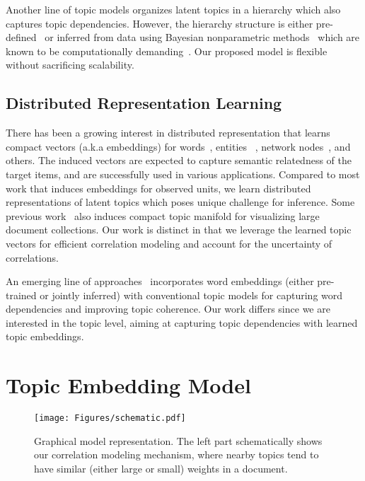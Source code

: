 \documentclass[sigconf]{acmart}
\begin{document}
Another line of topic models organizes latent topics in a hierarchy which also captures topic dependencies. However, the hierarchy structure is either pre-defined~\cite{li2006pachinko,hu2016grounding,boyd2007topic} or inferred from data using Bayesian nonparametric methods~\cite{dubey2014dependent,blei2010nested} which are known to be computationally demanding~\cite{gal2014pitfalls,hu2015large}. Our proposed model is flexible without sacrificing scalability. 
%
\subsection{Distributed Representation Learning}
There has been a growing interest in distributed representation that learns compact vectors (a.k.a embeddings) for words~\cite{mikolov2013distributed,lei2014low}, entities~\cite{hu2015entity,li2016joint} , network nodes~\cite{grover2016node2vec,tang2015pte}, and others. The induced vectors are expected to capture semantic relatedness of the target items, and are successfully used in various applications. Compared to most work that induces embeddings for observed units, we learn distributed representations of latent topics which poses unique challenge for inference. Some previous work~\cite{le2014semantic,le2014manifold} also induces compact topic manifold for visualizing large document collections. Our work is distinct in that we leverage the learned topic vectors for efficient correlation modeling and account for the uncertainty of correlations.

An emerging line of approaches~\cite{li2016generative,batmanghelich2016nonparametric,das2015gaussian,jiang2016latent} incorporates word embeddings (either pre-trained or jointly inferred) with conventional topic models for capturing word dependencies and improving topic coherence. Our work differs since we are interested in the topic level, aiming at capturing topic dependencies with learned topic embeddings.

\section{Topic Embedding Model}\label{sec:model}
%
\begin{figure}
\begin{center}
\texttt{[image: Figures/schematic.pdf]}
\caption{Graphical model representation. The left part schematically shows our correlation modeling mechanism, where nearby topics tend to have similar (either large or small) weights in a document.}
\label{fig:graphical}
\end{center}
\vspace{-8pt}
\end{figure}
\end{document}
